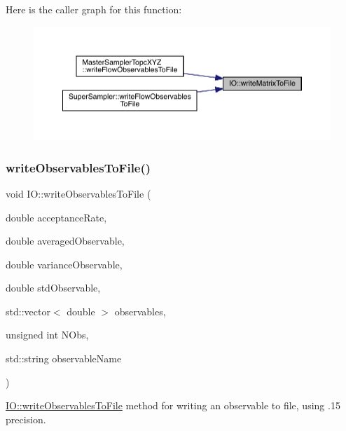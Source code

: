 Here is the caller graph for this function\+:
\nopagebreak
\begin{figure}[H]
\begin{center}
\leavevmode
\includegraphics[width=350pt]{namespace_i_o_ad77b7dd770afc8e2eb433d6187ea3616_icgraph}
\end{center}
\end{figure}
\mbox{\label{namespace_i_o_ad8cf5aef8f60d10b80292b69a091d5ac}} 
\subsubsection{\texorpdfstring{writeObservablesToFile()}{writeObservablesToFile()}}
{\footnotesize\ttfamily void I\+O\+::write\+Observables\+To\+File (\begin{DoxyParamCaption}\item[{double}]{acceptance\+Rate,  }\item[{double}]{averaged\+Observable,  }\item[{double}]{variance\+Observable,  }\item[{double}]{std\+Observable,  }\item[{std\+::vector$<$ double $>$}]{observables,  }\item[{unsigned int}]{N\+Obs,  }\item[{std\+::string}]{observable\+Name }\end{DoxyParamCaption})}



\mbox{\hyperlink{namespace_i_o_ad8cf5aef8f60d10b80292b69a091d5ac}{I\+O\+::write\+Observables\+To\+File}} method for writing an observable to file, using .15 precision. 



